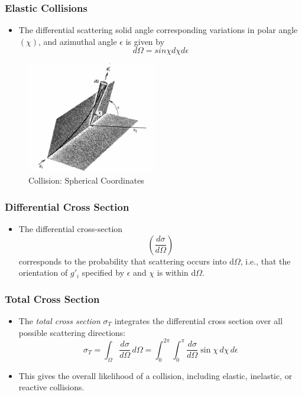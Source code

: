 \documentclass{beamer}
\begin{document}
\begin{frame}
\frametitle{Elastic Collisions}
\begin{itemize}
    \item The differential scattering solid angle corresponding variations in polar angle $(\chi)$, and azimuthal angle $\epsilon$ is given by
    $$
    d \Omega = sin \chi d \chi d\epsilon
    $$
\end{itemize}
\begin{figure}
        \centering
        \includegraphics[width=0.5\textwidth]{collision_elastic.png}
        \caption{Collision: Spherical Coordinates}
    \end{figure}

\end{frame}

\begin{frame}
\frametitle{Differential Cross Section}
\begin{itemize}
    \item The differential cross-section 
    $$
    \left(\frac{d \sigma}{d \Omega}\right)
    $$
  corresponds to the probability that scattering occurs into d$\Omega$, i.e., that the orientation of $g\prime_i$ specified by $\epsilon$ and  $\chi$ is within d$\Omega$.
\end{itemize}
\end{frame}

\begin{frame}
\frametitle{Total Cross Section}
\begin{itemize}
    \item The \emph{total cross section} $\sigma_T$ integrates the differential cross section over all possible scattering directions:
    \[
    \sigma_T = \int_{\Omega} \frac{d\sigma}{d\Omega} \, d\Omega = \int_0^{2\pi} \int_0^{\pi} \frac{d\sigma}{d\Omega} \sin \chi \, d\chi \, d\epsilon
    \]
    \item This gives the overall likelihood of a collision, including elastic, inelastic, or reactive collisions.
\end{itemize}
\end{frame}
\end{document}

